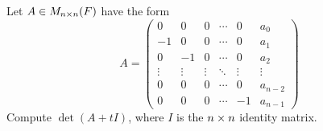 \begin{exercise} \label{exercise 4.3.24}
Let \(A \in M_{n \times n}(F)\) have the form
\[
    A = \left(\begin{array}{rrcccc}
        0 & 0 & 0 & \cdots & 0 & a_{0} \\
        -1 & 0 & 0 & \cdots & 0 & a_{1} \\
        0 & -1 & 0 & \cdots & 0 & a_{2} \\
        \vdots & \vdots & \vdots & \ddots & \vdots & \vdots \\
        0 & 0 & 0 & \cdots & 0 & a_{n-2} \\
        0 & 0 & 0 & \cdots & -1 & a_{n-1}
    \end{array}\right)
\]
Compute \(\det(A + tI)\), where \(I\) is the \(n \times n\) identity matrix.
\end{exercise}

